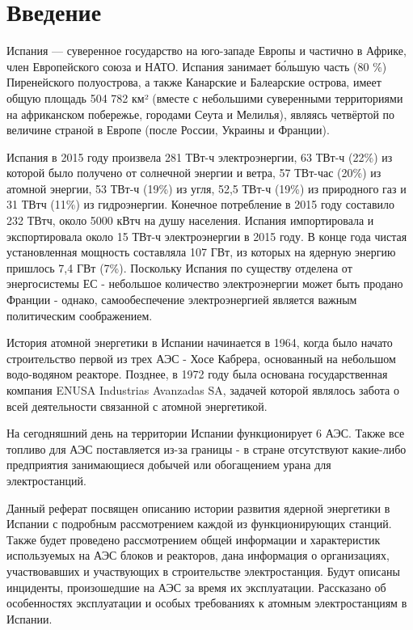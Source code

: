 \chapter*{Введение}
\label{sec:afterwords}

Испания — суверенное государство на юго-западе Европы и частично в Африке, член Европейского союза и НАТО. Испания занимает бо́льшую часть (80 \%) Пиренейского полуострова, а также Канарские и Балеарские острова, имеет общую площадь 504 782 км² (вместе с небольшими суверенными территориями на африканском побережье, городами Сеута и Мелилья), являясь четвёртой по величине страной в Европе (после России, Украины и Франции).

Испания в 2015 году произвела 281 ТВт-ч электроэнергии, 63 ТВт-ч (22\%) из которой было получено от солнечной энергии и ветра, 57 ТВт-час (20\%) из атомной энергии, 53 ТВт-ч (19\%) из угля, 52,5 ТВт-ч (19\%) из природного газ и 31 ТВтч (11\%) из гидроэнергии. Конечное потребление в 2015 году составило 232 ТВтч, около 5000 кВтч на душу населения. Испания импортировала и экспортировала около 15 ТВт-ч электроэнергии в 2015 году. В конце года чистая установленная мощность составляла 107 ГВт, из которых на ядерную энергию пришлось 7,4 ГВт (7\%). Поскольку Испания по существу отделена от энергосистемы ЕС - небольшое количество электроэнергии может быть продано Франции - однако, самообеспечение электроэнергией является важным политическим соображением.

История атомной энергетики в Испании начинается в 1964, когда было начато строительство первой из трех АЭС - Хосе Кабрера, основанный на небольшом водо-водяном реакторе. Позднее, в 1972 году была основана государственная компания ENUSA Industrias Avanzadas SA, задачей которой являлось забота о всей деятельности связанной с атомной энергетикой.

На сегодняшний день на территории Испании функционирует 6 АЭС. Также все топливо для АЭС поставляется из-за границы - в стране отсутствуют какие-либо предприятия занимающиеся добычей или обогащением урана для электростанций.

Данный реферат посвящен описанию истории развития ядерной энергетики в Испании с подробным рассмотрением каждой из функционирующих станций. Также будет проведено рассмотрением общей информации и характеристик используемых на АЭС блоков и реакторов, дана информация о организациях, участвовавших и участвующих в строительстве электростанция. Будут описаны инциденты, произошедшие на АЭС за время их эксплуатации. Рассказано об особенностях эксплуатации и особых требованиях к атомным электростанциям в Испании.